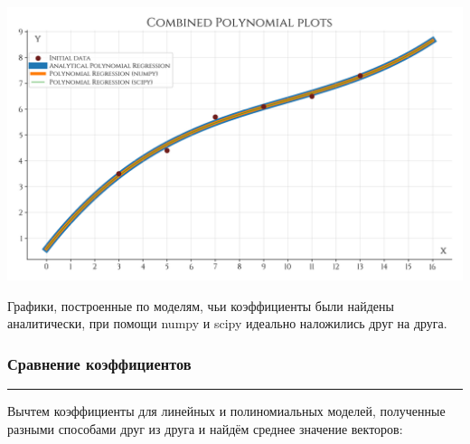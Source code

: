 \documentclass[a4paper, 14pt]{extarticle}
\begin{document}
\begin{center}
    \includegraphics[width=1\textwidth, height=1\textheight, keepaspectratio]{Combined_Polynomial_Plots} \\
\end{center}

Графики, построенные по моделям, чьи коэффициенты были найдены аналитически, при помощи numpy и scipy 
идеально наложились друг на друга.

\subsubsection*{{Сравнение коэффициентов}}\vspace{-20pt}\rule{\linewidth}{0.1mm}

Вычтем коэффициенты для линейных и полиномиальных моделей, полученные разными способами 
друг из друга и найдём среднее значение векторов:
\end{document}
